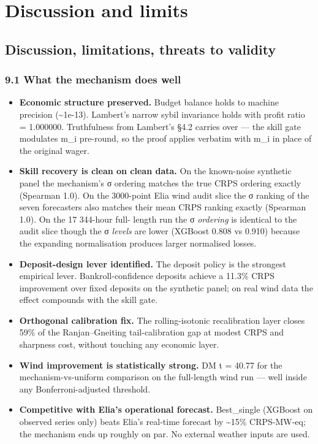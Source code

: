 \documentclass[11pt,a4paper,openany]{report}
\begin{document}
\part*{Discussion and limits}
\chapter{Discussion, limitations, threats to validity}

\section{9.1 What the mechanism does well}

\begin{itemize}
  \item \textbf{Economic structure preserved.} Budget balance holds to machine
    precision (\textasciitilde{}1e-13). Lambert's narrow sybil invariance holds with
    profit ratio = 1.000000. Truthfulness from Lambert's §4.2 carries
    over — the skill gate modulates m\_i pre-round, so the proof applies
    verbatim with m\_i in place of the original wager.
  \item \textbf{Skill recovery is clean on clean data.} On the known-noise
    synthetic panel the mechanism's σ ordering matches the true CRPS
    ordering exactly (Spearman 1.0). On the 3000-point Elia wind audit
    slice the σ ranking of the seven forecasters also matches their
    mean CRPS ranking exactly (Spearman 1.0). On the 17 344-hour full-
    length run the σ \emph{ordering} is identical to the audit slice though
    the σ \emph{levels} are lower (XGBoost 0.808 vs 0.910) because the
    expanding normalisation produces larger normalised losses.
  \item \textbf{Deposit-design lever identified.} The deposit policy is the
    strongest empirical lever. Bankroll-confidence deposits achieve a
    11.3\% CRPS improvement over fixed deposits on the synthetic panel;
    on real wind data the effect compounds with the skill gate.
  \item \textbf{Orthogonal calibration fix.} The rolling-isotonic recalibration
    layer closes 59\% of the Ranjan–Gneiting tail-calibration gap at
    modest CRPS and sharpness cost, without touching any economic
    layer.
  \item \textbf{Wind improvement is statistically strong.} DM t = 40.77 for the
    mechanism-vs-uniform comparison on the full-length wind run — well
    inside any Bonferroni-adjusted threshold.
  \item \textbf{Competitive with Elia's operational forecast.} Best\_single
    (XGBoost on observed series only) beats Elia's real-time forecast
    by \textasciitilde{}15\% CRPS-MW-eq; the mechanism ends up roughly on par. No
    external weather inputs are used.
\end{itemize}
\end{document}
